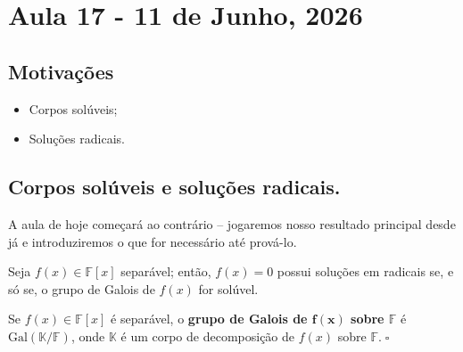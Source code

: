 \documentclass[../algebraIII_notes.tex]{subfiles}
\begin{document}
\section{Aula 17 - 11 de Junho, 2026}
\subsection{Motivações}
\begin{itemize}
	\item Corpos solúveis;
	\item Soluções radicais.
\end{itemize}
\subsection{Corpos solúveis e soluções radicais.}
A aula de hoje começará ao contrário -- jogaremos nosso resultado principal desde já e introduziremos o que for necessário até prová-lo.
\begin{theorem*}
	Seja \(f(x)\in \mathbb{F}[x]\) separável; então, \(f(x) = 0\) possui soluções em radicais se, e só se, o grupo de Galois de \(f(x)\) for solúvel.
\end{theorem*}
\begin{def*}
	Se \(f(x)\in \mathbb{F}[x]\) é separável, o \textbf{grupo de Galois de \(\mathbf{f(x)}\) sobre \(\mathbf{\mathbb{F}}\)} é \(\mathrm{Gal}(\mathbb{K}/\mathbb{F})\), onde \(\mathbb{K}\) é um corpo de decomposição de \(f(x)\) sobre \(\mathbb{F}.\; \square\)
\end{def*}
\end{document}

